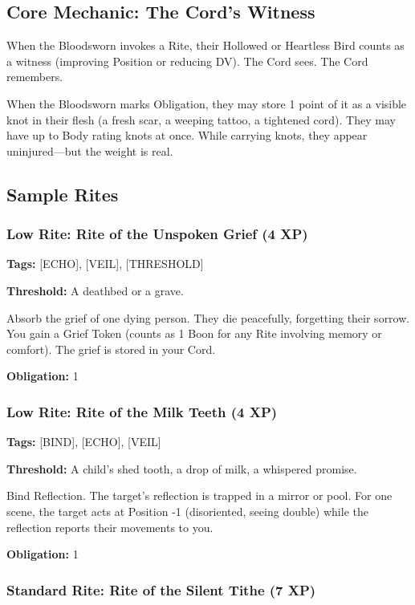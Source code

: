 \subsection{Core Mechanic: The Cord's Witness}

When the Bloodsworn invokes a Rite, their Hollowed or Heartless Bird counts as a witness (improving Position or reducing DV). The Cord sees. The Cord remembers.

When the Bloodsworn marks Obligation, they may store 1 point of it as a visible knot in their flesh (a fresh scar, a weeping tattoo, a tightened cord). They may have up to Body rating knots at once. While carrying knots, they appear uninjured—but the weight is real.

\subsection{Sample Rites}

\subsubsection{Low Rite: Rite of the Unspoken Grief (4 XP)}

\textbf{Tags:} [ECHO], [VEIL], [THRESHOLD]

\textbf{Threshold:} A deathbed or a grave.

Absorb the grief of one dying person. They die peacefully, forgetting their sorrow. You gain a Grief Token (counts as 1 Boon for any Rite involving memory or comfort). The grief is stored in your Cord.

\textbf{Obligation:} 1

\subsubsection{Low Rite: Rite of the Milk Teeth (4 XP)}

\textbf{Tags:} [BIND], [ECHO], [VEIL]

\textbf{Threshold:} A child's shed tooth, a drop of milk, a whispered promise.

Bind Reflection. The target's reflection is trapped in a mirror or pool. For one scene, the target acts at Position -1 (disoriented, seeing double) while the reflection reports their movements to you.

\textbf{Obligation:} 1

\subsubsection{Standard Rite: Rite of the Silent Tithe (7 XP)}

